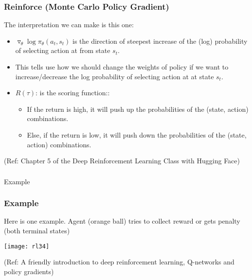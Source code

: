 \begin{frame}[fragile]\frametitle{Reinforce (Monte Carlo Policy Gradient)}

The interpretation we can make is this one:

\begin{itemize}
\item $\triangledown_\theta \log\pi_\theta(a_t,s_t)$  is the direction of steepest increase of the (log) probability of selecting action at from state  $s_t$. 
\item This tells use how we should change the weights of policy if we want to increase/decrease the log probability of selecting action at at state $s_t$.
\item $R(\tau)$: is the scoring function::
\begin{itemize}
\item If the return is high, it will push up the probabilities of the (state, action) combinations.
\item Else, if the return is low, it will push down the probabilities of the (state, action) combinations.
\end{itemize}
\end{itemize}

{\tiny (Ref: Chapter 5 of the Deep Reinforcement Learning Class with Hugging Face)}

\end{frame}


\begin{frame}[fragile]\frametitle{}
\begin{center}
{\Large Example}
\end{center}
\end{frame}



\begin{frame}[fragile]\frametitle{Example}

Here is one example. Agent (orange ball) tries to collect reward or gets penalty (both terminal states)

\begin{center}
\texttt{[image: rl34]}
\end{center}

{\tiny (Ref: A friendly introduction to deep reinforcement learning, Q-networks and policy gradients)}

\end{frame}

